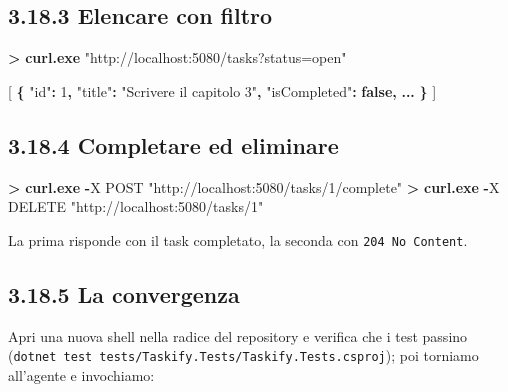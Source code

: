 \documentclass[
  italian,
  10pt,
]{book}
\newenvironment{Shaded}{\begin{snugshade}}{\end{snugshade}}
\newcommand{\DataTypeTok}[1]{\textcolor[rgb]{0.13,0.29,0.53}{#1}}
\newcommand{\DecValTok}[1]{\textcolor[rgb]{0.00,0.00,0.81}{#1}}
\newcommand{\ErrorTok}[1]{\textcolor[rgb]{0.64,0.00,0.00}{\textbf{#1}}}
\newcommand{\FunctionTok}[1]{\textcolor[rgb]{0.13,0.29,0.53}{\textbf{#1}}}
\newcommand{\KeywordTok}[1]{\textcolor[rgb]{0.13,0.29,0.53}{\textbf{#1}}}
\newcommand{\NormalTok}[1]{#1}
\newcommand{\OperatorTok}[1]{\textcolor[rgb]{0.81,0.36,0.00}{\textbf{#1}}}
\newcommand{\OtherTok}[1]{\textcolor[rgb]{0.56,0.35,0.01}{#1}}
\newcommand{\StringTok}[1]{\textcolor[rgb]{0.31,0.60,0.02}{#1}}
\begin{document}
\subsection{3.18.3 Elencare con filtro}\label{elencare-con-filtro}

\begin{Shaded}
\begin{Highlighting}[]
\OperatorTok{\textgreater{}} \FunctionTok{curl}\OperatorTok{.}\FunctionTok{exe} \StringTok{"http://localhost:5080/tasks?status=open"}
\end{Highlighting}
\end{Shaded}

\begin{Shaded}
\begin{Highlighting}[]
\OtherTok{[}
  \FunctionTok{\{} \DataTypeTok{"id"}\FunctionTok{:} \DecValTok{1}\FunctionTok{,} \DataTypeTok{"title"}\FunctionTok{:} \StringTok{"Scrivere il capitolo 3"}\FunctionTok{,} \DataTypeTok{"isCompleted"}\FunctionTok{:} \KeywordTok{false}\FunctionTok{,} \ErrorTok{...} \FunctionTok{\}}
\OtherTok{]}
\end{Highlighting}
\end{Shaded}

\subsection{3.18.4 Completare ed
eliminare}\label{completare-ed-eliminare}

\begin{Shaded}
\begin{Highlighting}[]
\OperatorTok{\textgreater{}} \FunctionTok{curl}\OperatorTok{.}\FunctionTok{exe} \OperatorTok{{-}}\NormalTok{X POST }\StringTok{"http://localhost:5080/tasks/1/complete"}
\OperatorTok{\textgreater{}} \FunctionTok{curl}\OperatorTok{.}\FunctionTok{exe} \OperatorTok{{-}}\NormalTok{X DELETE }\StringTok{"http://localhost:5080/tasks/1"}
\end{Highlighting}
\end{Shaded}

La prima risponde con il task completato, la seconda con
\texttt{204\ No\ Content}.

\subsection{3.18.5 La convergenza}\label{la-convergenza}

Apri una nuova shell nella radice del repository e verifica che i test
passino
(\texttt{dotnet\ test\ tests/Taskify.Tests/Taskify.Tests.csproj}); poi
torniamo all'agente e invochiamo:
\end{document}
